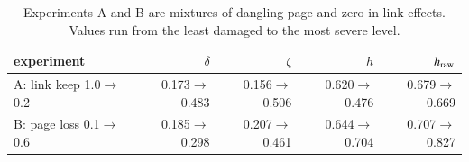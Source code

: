 \begin{table}[t]
\centering
\small
\caption{Experiments A and B are mixtures of dangling-page and zero-in-link effects. Values run from the least damaged to the most severe level.}
\label{tab:mixture}
\begin{tabular}{@{}lrrrr@{}}\toprule
experiment & $\delta$ & $\zeta$ & $h$ & $h_{\rm raw}$ \\
\midrule
A: link keep 1.0$\to$0.2 & 0.173$\to$0.483 & 0.156$\to$0.506 & 0.620$\to$0.476 & 0.679$\to$0.669 \\
B: page loss 0.1$\to$0.6 & 0.185$\to$0.298 & 0.207$\to$0.461 & 0.644$\to$0.704 & 0.707$\to$0.827 \\
\bottomrule\end{tabular}
\end{table}
